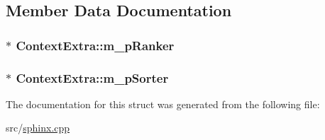 \subsection{Member Data Documentation}
\hypertarget{structContextExtra_aef5b7622ed20e52f148846873e9d69b9}{
\subsubsection[{m\-\_\-p\-Ranker}]{$\ast$ Context\-Extra\-::m\-\_\-p\-Ranker}}\label{structContextExtra_aef5b7622ed20e52f148846873e9d69b9}
\hypertarget{structContextExtra_a285024a92158bbeb503f1cb870558226}{
\subsubsection[{m\-\_\-p\-Sorter}]{$\ast$ Context\-Extra\-::m\-\_\-p\-Sorter}}\label{structContextExtra_a285024a92158bbeb503f1cb870558226}


The documentation for this struct was generated from the following file\-:\begin{DoxyCompactItemize}
\item 
src/\hyperlink{sphinx_8cpp}{sphinx.\-cpp}\end{DoxyCompactItemize}
